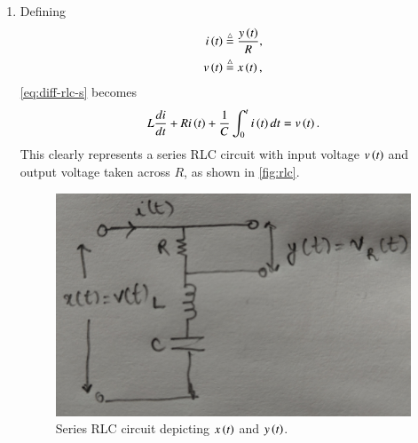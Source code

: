 \documentclass[journal,12pt,twocolumn]{IEEEtran}
\begin{document}
\begin{enumerate}[label=\theenumi.]
    \item Defining
    \begin{align}
        i\left(t\right) &\stackrel{\triangle}{=} \frac{y\left(t\right)}{R}, \label{eq:current-def} \\
        v\left(t\right) &\stackrel{\triangle}{=} x\left(t\right),
    \end{align}
    \eqref{eq:diff-rlc-s} becomes
    \begin{equation}
        L\frac{di}{dt} + Ri\left(t\right) + \frac{1}{C}\int_{0}^ti\left(t\right)dt = v\left(t\right).
        \label{eq:diff-rlc-t}
    \end{equation}
    This clearly represents a series RLC circuit with input voltage \(v\left(t\right)\)
    and output voltage taken across \(R\), as shown in \autoref{fig:rlc}.
    \begin{figure}[!ht]
        \centering
        \includegraphics[width=\columnwidth]{figs/rlc.jpg}
        \caption{Series RLC circuit depicting \(x\left(t\right)\) and \(y\left(t\right)\).}
        \label{fig:rlc}
    \end{figure}


\end{enumerate}
\end{document}
